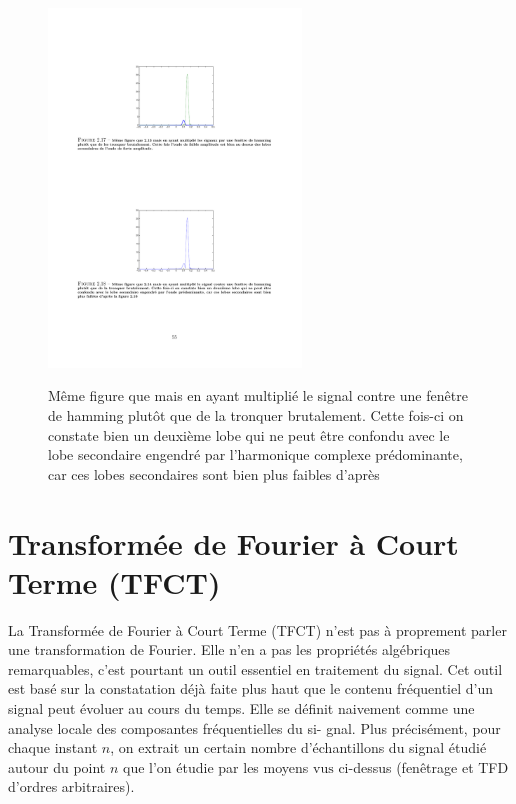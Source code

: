 \begin{figure}
  \centering
  \includegraphics[width=0.6\textwidth]{Figures/Figure2-18}\\
  \caption{M\^{e}me figure que  mais en ayant multipli\'{e} le signal contre une fen\^{e}tre de hamming plut\^{o}t que de la tronquer brutalement. Cette fois-ci on constate bien un deuxi\`{e}me lobe qui ne peut \^{e}tre confondu avec le lobe secondaire engendr\'{e} par l'harmonique complexe pr\'{e}dominante, car ces lobes secondaires sont bien plus faibles d'apr\`{e}s }\label{fig:figure2-18}
\end{figure}


\section{Transformée de Fourier à Court Terme (TFCT)}
La Transform\'{e}e de Fourier \`{a} Court Terme (TFCT) n'est pas \`{a} proprement parler une transformation de Fourier. Elle n'en a pas les propri\'{e}t\'{e}s alg\'{e}briques remarquables, c'est pourtant un outil essentiel en traitement du signal. Cet outil est bas\'{e} sur la constatation d\'{e}j\`{a} faite plus haut que le contenu fr\'{e}quentiel d'un signal peut \'{e}voluer au cours du temps. Elle se d\'{e}finit naivement comme une analyse locale des composantes fr\'{e}quentielles du si- gnal. Plus pr\'{e}cis\'{e}ment, pour chaque instant $n$, on extrait un certain nombre d'\'{e}chantillons du signal \'{e}tudi\'{e} autour du point $n$ que l'on \'{e}tudie par les moyens $\mathrm{v}\mathrm{u}\mathrm{s}$ ci-dessus (fen\^{e}trage et TFD d'ordres arbitraires).

